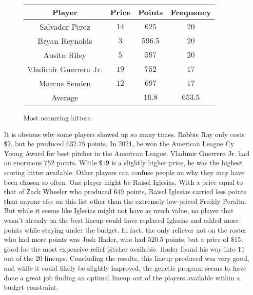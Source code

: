 \begin{figure}[htb]
  \centering 
  \begin{tabular}{|c|c|c|c|} 
    \hline \hline 
    Player & Price & Points & Frequency \\ 
    \hline 
    Salvador Perez & $14$ & $625$ & $20$ \\
    Bryan Reynolds & $3$ & $596.5$ & 
    $20$ \\
    Ausitn Riley & $5$ & $597$ & $20$ \\
    Vladimir Guerrero Jr. & $19$ & $752$ & $17$ \\
    Marcus Semien & $12$ & $697$ & $17$ \\
    \hline 
    Average & & $10.8$ & $653.5$ \\
    \hline \hline
  \end{tabular}

  \caption{Most occurring hitters.}
  \label{tab:example}

\end{figure}

It is obvious why some players showed up so many times. Robbie Ray only costs $\$2$, but he produced $632.75$ points. In 2021, he won the American League Cy Young Award for best pitcher in the American League. Vladimir Guerrero Jr. had an enormous $752$ points. While $\$19$ is a slightly higher price, he was the highest scoring hitter available. Other players can confuse people on why they may have been chosen so often. One player might be Raisel Iglesias. With a price equal to that of Zack Wheeler who produced $649$ points, Raisel Iglesias carried less points than anyone else on this list other than the extremely low-priced Freddy Peralta. But while it seems like Iglesias might not have as much value, no player that wasn't already on the best lineup could have replaced Iglesias and added more points while staying under the budget. In fact, the only reliever not on the roster who had more points was Josh Hader, who had $520.5$ points, but a price of $\$15$, good for the most expensive relief pitcher available. Hader found his way into $11$ out of the $20$ lineups. Concluding the results, this lineup produced was very good, and while it could likely be slightly improved, the genetic program seems to have done a great job finding an optimal lineup out of the players available within a budget constraint.



